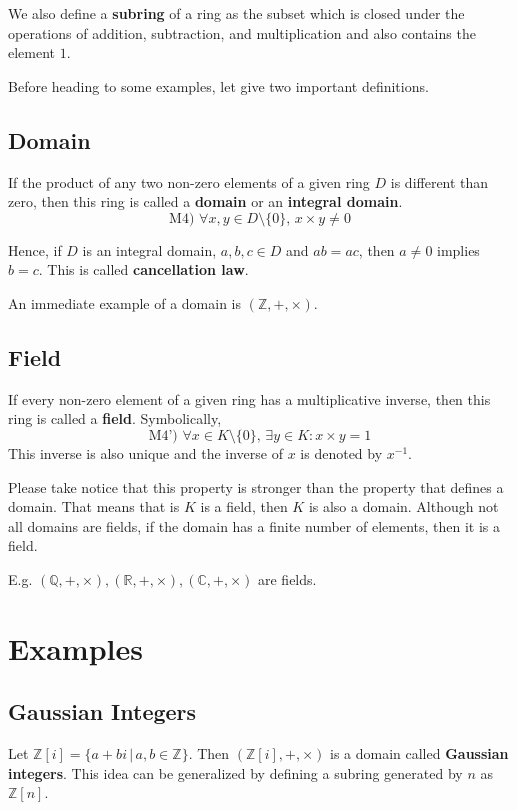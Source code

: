 \documentclass[12pt,a4paper]{article}
\theoremstyle{definition}
\begin{document}
We also define a \textbf{subring} of a ring as the subset which is closed under the operations of addition, subtraction, and multiplication and also contains the element $1$.

Before heading to some examples, let give two important definitions.

\subsection{Domain}\label{domain}

If the product of any two non-zero elements of a given ring \(D\) is different than zero, then this ring is called a \textbf{domain} or an \textbf{integral domain}.
\[\text{M4) } \forall x, y \in D \setminus \{ 0 \}, \, x \times y \neq 0\]

Hence, if $D$ is an integral domain, $a,b,c \in D$ and $ab = ac$, then $a \neq 0$ implies $b=c$. This is called \textbf{cancellation law}.

An immediate example of a domain is $(\mathbb{Z}, +, \times)$.

\subsection{Field}\label{field}

If every non-zero element of a given ring has a multiplicative inverse, then this ring is called a \textbf{field}. Symbolically,
\[\text{M4') }\forall x \in K \setminus \{0 \}, \, \exists y \in K : x \times y = 1\]
This inverse is also unique and the inverse of $x$ is denoted by $x^{-1}$.

Please take notice that this property is stronger than the property that defines a domain. That means that is \(K\) is a field, then \(K\) is also a domain. Although not all domains are fields, if the domain has a finite number of elements, then it is a field.

E.g. \((\mathbb{Q},+,\times), (\mathbb{R},+,\times), (\mathbb{C},+,\times)\) are fields.

\section{Examples}

\subsection{Gaussian Integers}

Let \(\mathbb{Z}[i] = \{ a+ bi \, |  \, a,b \in \mathbb{Z} \}\). Then \((\mathbb{Z}[i], +, \times)\) is a domain called \textbf{Gaussian integers}. This idea can be generalized by defining a subring generated by $n$ as $\mathbb{Z}[n]$.
\end{document}
